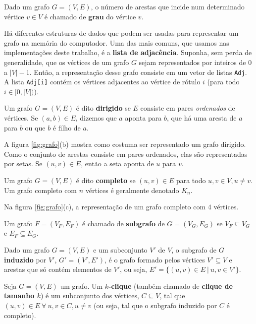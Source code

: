 Dado um grafo $G = (V, E)$, o número de arestas que incide num determinado vértice $v \in V$ é chamado de \textbf{grau} do vértice $v$.

Há diferentes estruturas de dados que podem ser usadas para representar um grafo na memória do computador. Uma das mais comuns, que usamos nas implementações deste trabalho, é a \textbf{lista de adjacência}. Suponha, sem perda de generalidade, que os vértices de um grafo $G$ sejam representados por inteiros de $0$ a $|V|-1$. Então, a representação desse grafo consiste em um vetor de listas {\tt Adj}. A lista {\tt Adj[i]} contém os vértices adjacentes ao vértice de rótulo $i$ (para todo $i \in [0, |V|)$).

\vspace{2em}

Um grafo $G = (V, E)$ é dito \textbf{dirigido} se $E$ consiste em pares \emph{ordenados} de vértices. Se $(a, b) \in E$, dizemos que $a$ aponta para $b$, que há uma aresta de $a$ para $b$ ou que $b$ é filho de $a$.

A figura \ref{fig:grafo}(b) mostra como costuma ser representado um grafo dirigido. Como o conjunto de arestas consiste em pares ordenados, elas são representadas por setas. Se $(u, v) \in E$, então a seta aponta de $u$ para $v$.

\vspace{2em}

Um grafo $G = (V, E)$ é dito \textbf{completo} se $(u, v) \in E$ para todo $u, v \in V, u \neq v$. Um grafo completo com $n$ vértices é geralmente denotado $K_n$.

Na figura \ref{fig:grafo}(c), a representação de um grafo completo com $4$ vértices.

\vspace{2em}

Um grafo $F = (V_F, E_F)$ é chamado de \textbf{subgrafo} de $G = (V_G, E_G)$ se $V_F \subseteq V_G$ e $E_F \subseteq E_G$.

Dado um grafo $G = (V, E)$ e um subconjunto $V'$ de $V$, o subgrafo de $G$ \textbf{induzido} por $V'$, $G' = (V', E')$, é o grafo formado pelos vértices $V' \subseteq V$ e arestas que só contém elementos de $V'$, ou seja, $E' = \{(u, v) \in E \ | \  u, v \in V'\}$.

\vspace{2em}

Seja $G = (V, E)$ um grafo. Um \textbf{$k$-clique} (também chamado de \textbf{clique de tamanho $k$}) é um subconjunto dos vértices, $C \subseteq V$, tal que $(u, v) \in E \ \forall \ u, v \in C, u \neq v$ (ou seja, tal que o subgrafo induzido por $C$ é completo).

